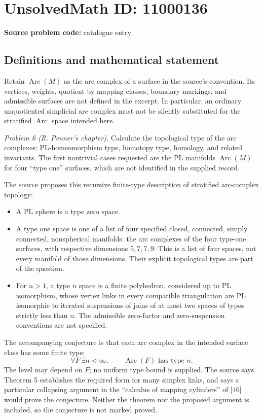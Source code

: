 \documentclass[11pt]{article}
\begin{document}
\section*{UnsolvedMath ID: 11000136}
\textbf{Source problem code:} catalogue entry
\subsection{Definitions and mathematical statement}
Retain \(\operatorname{Arc}(M)\) as the arc complex of a surface in the source's convention. Its vertices, weights, quotient by mapping classes, boundary markings, and admissible surfaces are not defined in the excerpt. In particular, an ordinary unquotiented simplicial arc complex must not be silently substituted for the stratified \(\operatorname{Arc}\) space intended here.

\emph{Problem 6 (R. Penner's chapter).} Calculate the topological type of the arc complexes: PL-homeomorphism type, homotopy type, homology, and related invariants. The first nontrivial cases requested are the PL manifolds \(\operatorname{Arc}(M)\) for four ``type one'' surfaces, which are not identified in the supplied record.

The source proposes this recursive finite-type description of stratified arc-complex topology:
\begin{itemize}
\item A PL sphere is a type zero space.
\item A type one space is one of a list of four specified closed, connected, simply connected, nonspherical manifolds: the arc complexes of the four type-one surfaces, with respective dimensions \(5,7,7,9\). This is a list of four spaces, not every manifold of those dimensions. Their explicit topological types are part of the question.
\item For \(n>1\), a type \(n\) space is a finite polyhedron, considered up to PL isomorphism, whose vertex links in every compatible triangulation are PL isomorphic to iterated suspensions of joins of at most two spaces of types strictly less than \(n\). The admissible zero-factor and zero-suspension conventions are not specified.
\end{itemize}
The accompanying conjecture is that each arc complex in the intended surface class has some finite type:
\[
 \forall F\ \exists n<\infty,\qquad\operatorname{Arc}(F)\text{ has type }n.
\]
The level may depend on \(F\); no uniform type bound is supplied. The source says Theorem 5 establishes the required form for many simplex links, and says a particular collapsing argument in the ``calculus of mapping cylinders'' of [46] would prove the conjecture. Neither the theorem nor the proposed argument is included, so the conjecture is not marked proved.
\end{document}
